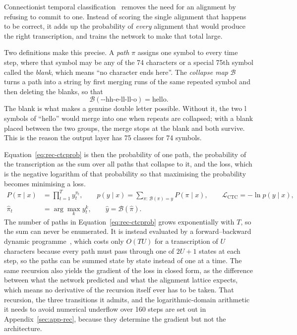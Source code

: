 Connectionist temporal classification~\cite{graves2006} removes the need for an alignment by refusing to commit to one. Instead of scoring the single alignment that happens to be correct, it adds up the probability of \emph{every} alignment that would produce the right transcription, and trains the network to make that total large.

Two definitions make this precise. A \emph{path} $\pi$ assigns one symbol to every time step, where that symbol may be any of the 74 characters or a special 75th symbol called the \emph{blank}, which means ``no character ends here''. The \emph{collapse map} $\mathcal B$ turns a path into a string by first merging runs of the same repeated symbol and then deleting the blanks, so that
\[
\mathcal B(\text{{-}{-}hh{-}e{-}ll{-}ll{-}o})=\text{hello}.
\]
The blank is what makes a genuine double letter possible. Without it, the two l symbols of ``hello'' would merge into one when repeats are collapsed; with a blank placed between the two groups, the merge stops at the blank and both survive. This is the reason the output layer has 75 classes for 74 symbols.

Equation~\ref{eq:rec-ctcprob} is then the probability of one path, the probability of the transcription as the sum over all paths that collapse to it, and the loss, which is the negative logarithm of that probability so that maximising the probability becomes minimising a loss.
\begin{align}
P(\pi\mid x)&=\prod_{t=1}^{T}y_t^{\pi_t},\qquad p(y\mid x)=\!\!\sum_{\pi:\,\mathcal B(\pi)=y}\!\!P(\pi\mid x),\qquad \mathcal L_{\mathrm{CTC}}=-\ln p(y\mid x),\label{eq:rec-ctcprob}\\
\hat\pi_t&=\arg\max_k y_t^k,\qquad \hat y=\mathcal B(\hat\pi).\label{eq:rec-greedy}
\end{align}
The number of paths in Equation~\ref{eq:rec-ctcprob} grows exponentially with $T$, so the sum can never be enumerated. It is instead evaluated by a forward--backward dynamic programme~\cite{graves2006}, which costs only $O(TU)$ for a transcription of $U$ characters because every path must pass through one of $2U+1$ states at each step, so the paths can be summed state by state instead of one at a time. The same recursion also yields the gradient of the loss in closed form, as the difference between what the network predicted and what the alignment lattice expects, which means no derivative of the recursion itself ever has to be taken. That recursion, the three transitions it admits, and the logarithmic-domain arithmetic it needs to avoid numerical underflow over 160 steps are set out in Appendix~\ref{sec:app-rec}, because they determine the gradient but not the architecture.

